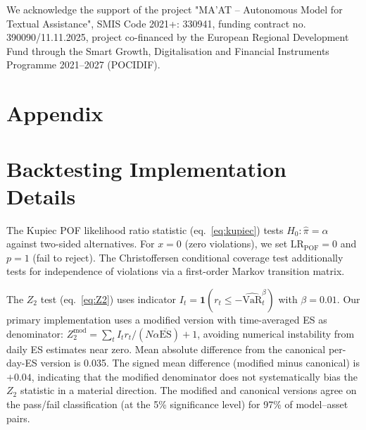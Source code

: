 \documentclass[preprint,11pt,authoryear]{elsarticle}
\newcommand{\VaR}{\mathrm{VaR}}
\newcommand{\ES}{\mathrm{ES}}
\newcommand{\1}{\boldsymbol{1}}
\begin{document}
	We acknowledge the support of the project "MA'AT – Autonomous
	Model for Textual Assistance", SMIS Code 2021+: 330941, funding contract no. 390090/11.11.2025, project co-financed by the European Regional Development Fund through the Smart Growth, Digitalisation and Financial Instruments Programme 2021–2027 (POCIDIF).
	
	
	
	
	
	
	
	
	\newpage
	\appendix
	\renewcommand{\thesection}{\Alph{section}}
	
	\section*{Appendix}
	
	\section{Backtesting Implementation Details}
	\label{app:backtesting}
	
	The Kupiec POF likelihood ratio statistic (eq.~\ref{eq:kupiec})
	tests $H_0: \hat\pi = \alpha$ against two-sided alternatives.
	For $x=0$ (zero violations), we set $\mathrm{LR}_{\mathrm{POF}}=0$
	and $p=1$ (fail to reject). The Christoffersen conditional coverage
	test \citep{christoffersen1998} additionally tests for independence
	of violations via a first-order Markov transition matrix.
	
	The $Z_2$ test (eq.~\ref{eq:Z2}) uses indicator
	$I_t = \1(r_t \leq -\widehat{\VaR}_t^\beta)$ with $\beta = 0.01$.
	Our primary implementation uses a modified version with
	time-averaged ES as denominator:
	$Z_2^{\text{mod}} = \sum_t I_t r_t / (N\alpha\overline{\ES}) + 1$,
	avoiding numerical instability from daily ES estimates near zero.
	Mean absolute difference from the canonical per-day-ES version
	is 0.035. The signed mean difference (modified minus canonical) is $+0.04$, indicating that the modified denominator does not systematically bias the $Z_2$ statistic in a material direction. The modified and canonical versions agree on the pass/fail classification (at the 5\% significance level) for 97\% of model--asset pairs.
	
\end{document}

